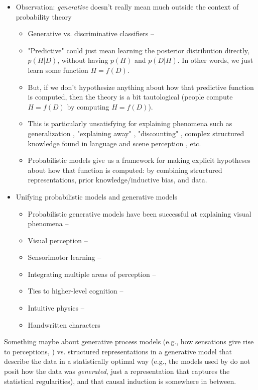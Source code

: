 \documentclass[12pt]{article}
\begin{document}
\begin{itemize}
\item Observation: \textit{generative} doesn't really mean much outside the context of probability theory
    \begin{itemize}
    \item Generative vs. discriminative classifiers -- \citep{Ng2002}
    \item "Predictive" could just mean learning the posterior distribution directly, $p(H|D)$, without having $p(H)$ and $p(D|H)$. In other words, we just learn some function $H=f(D)$.
    \item But, if we don't hypothesize anything about how that predictive function is computed, then the theory is a bit tautological (people compute $H=f(D)$ by computing $H=f(D)$).
    \item This is particularly unsatisfying for explaining phenomena such as generalization \citep{Tenenbaum2001}, "explaining away" \citep{Battaglia2012}, "discounting" \citep{Battaglia2012}, complex structured knowledge found in language and scene perception \citep{Griffiths2010}, etc.
    \item Probabilistic models give us a framework for making explicit hypotheses about how that function is computed: by combining structured representations, prior knowledge/inductive bias, and data.
    \end{itemize}

\item Unifying probabilistic models and generative models
    \begin{itemize}
    \item Probabilistic generative models have been successful at explaining visual phenomena -- \citep{Battaglia2012}
    \item Visual perception -- \citep{Weiss2002}
    \item Sensorimotor learning -- \citep{Kording2004}
    \item Integrating multiple areas of perception -- \citep{Ernst2002}
    \item Ties to higher-level cognition -- \citep{Yuille2006}
    \item Intuitive physics -- \citep{Teglas2011}
    \item Handwritten characters \citep{Lake2015}
    \end{itemize}

\end{itemize}

Something maybe about generative process models (e.g., how sensations give rise to perceptions, \cite{Battaglia2012,Yuille2006,Lake2015}) vs. structured representations in a generative model that describe the data in a statistically optimal way (e.g., the models used by \cite{Kemp2007,Kemp2010,Kemp2008} do not posit how the data was \textit{generated}, just a representation that captures the statistical regularities), and that causal induction is somewhere in between.

\end{document}
